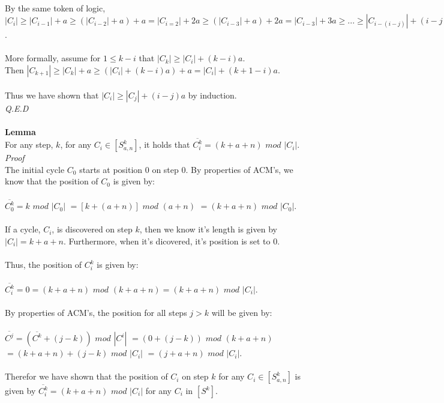 \documentclass[a4paper,12pt]{article}
\begin{document}
\\
By the same token of logic, $|C_i| \geq |C_{i-1}| + a \geq (|C_{i-2}| + a) + a = |C_{i=2}| + 2a \geq (|C_{i-3}| + a) + 2a = |C_{i-3}| + 3a \geq ... \geq |C_{i-(i - j)}| + (i-j)a = |C_j| + (i-j)a$.\\
\\
More formally, assume for $1 \leq k - i$ that $|C_k| \geq |C_i| + (k-i)a$.\\
Then $|C_{k+1}| \geq |C_k| + a \geq (|C_i| + (k-i)a) + a = |C_i| + (k + 1 - i)a$.\\
\\
Thus we have shown that $|C_{i}| \geq |C_j| + (i - j)a$ by induction.\\
\textit{Q.E.D}\\
\\
\textbf{Lemma}\\
For any step, $k$, for any $C_i \in [S^k_{a,n}]$, it holds that $\overline{C^k_i} = (k + a + n)$ $mod$ $|C_i|$.\\
\textit{Proof}\\  
The initial cycle $C_0$ starts at position $0$ on step $0$. By properties of ACM's, we know that the position of $C_0$ is given by:\\
\\
$\overline{C^k_0} = k$ $mod$ $|C_0| $
$= [k +(a + n)]$ $mod$ $(a + n)$
$= (k + a + n)$ $mod$ $|C_0|$.\\
\\
If a cycle, $C_i$, is discovered on step $k$, then we know it's length is given by $|C_i| = k + a + n$. Furthermore, when it's dicovered, it's position is set to 0.\\
\\
Thus, the position of $C^k_i$ is given by:\\
\\
$\overline{C^k_i} = 0 = (k + a + n)$ $mod$ $(k + a + n) = (k + a + n)$ $mod$ $|C_i|$.\\
\\
By properties of ACM's, the position for all steps $j > k$ will be given by:\\
\\
$\overline{C^j} = (\overline{C^k} + (j - k))$ $mod$ $|C^i|$
$= (0 + (j-k))$ $mod$ $(k + a + n)$\\
$= (k + a +n) + (j-k)$ $mod$ $|C_i| $
$= (j + a + n)$ $mod$ $|C_i|$.\\
\\
Therefor we have shown that the position of $C_i$ on step $k$ for any $C_i \in [S^k_{a,n}]$ is given by $\overline{C^k_i} = (k + a + n)$ $mod$ $|C_i|$ for any $C_i$ in $[S^k]$.\\
\end{document}
